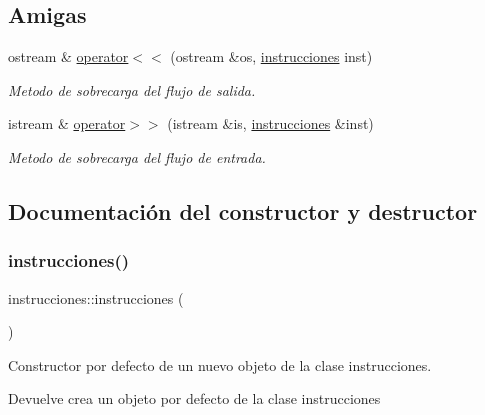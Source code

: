 \subsection*{Amigas}
\begin{DoxyCompactItemize}
\item 
ostream \& \hyperlink{classinstrucciones_a18db657893cefcd60d7b79becb90a1c5}{operator$<$$<$} (ostream \&os, \hyperlink{classinstrucciones}{instrucciones} inst)
\begin{DoxyCompactList}\small\item\em Metodo de sobrecarga del flujo de salida. \end{DoxyCompactList}\item 
istream \& \hyperlink{classinstrucciones_a0f29981464115f829915ff9f43275477}{operator$>$$>$} (istream \&is, \hyperlink{classinstrucciones}{instrucciones} \&inst)
\begin{DoxyCompactList}\small\item\em Metodo de sobrecarga del flujo de entrada. \end{DoxyCompactList}\end{DoxyCompactItemize}


\subsection{Documentación del constructor y destructor}
\mbox{\label{classinstrucciones_a99948e5f47de8b6f381ce6dc41117491}} 
\subsubsection{\texorpdfstring{instrucciones()}{instrucciones()}\hspace{0.1cm}{\footnotesize\ttfamily [1/3]}}
{\footnotesize\ttfamily instrucciones\+::instrucciones (\begin{DoxyParamCaption}{ }\end{DoxyParamCaption})}



Constructor por defecto de un nuevo objeto de la clase instrucciones. 

\begin{DoxyReturn}{Devuelve}
crea un objeto por defecto de la clase instrucciones 
\end{DoxyReturn}
\mbox{\label{classinstrucciones_aab99f88e640abf3f66717a45d7f4dc33}} 

